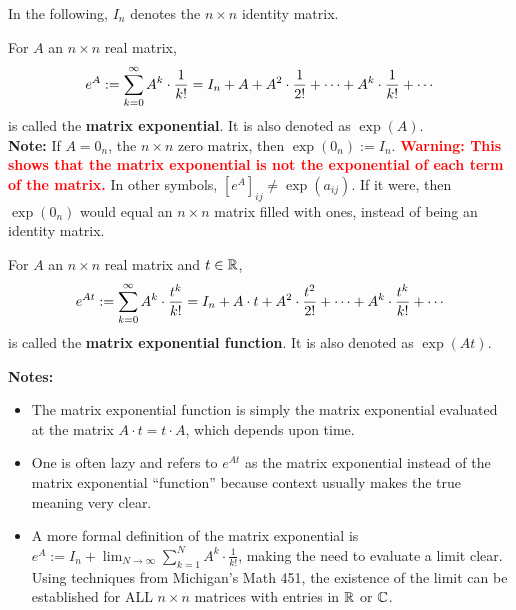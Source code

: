 \begin{tcolorbox}[colback=mylightblue, title = {\bf Matrix Exponential and Exponential Function}, breakable]
In the following, $I_n$ denotes the $n \times n$ identity matrix.
\begin{definition}
For $A$ an $n \times n$ real matrix,
\begin{equation}
    \label{eq:matrixExponential}
  e^{A}:=  \sum_{k=0}^\infty A^k \cdot \frac{1}{k!} = I_n + A  + A^2 \cdot \frac{1}{2!} + \cdots + A^k \cdot \frac{1}{k!} + \cdots \\[1em]
\end{equation}
is called the \textbf{matrix exponential}. It is also denoted as $\exp(A)$. \\

\textbf{Note:} If $A=0_{n}$, the $n \times n$ zero matrix, then $\exp(0_n):=I_n$. \textcolor{red}{\bf Warning: This shows that the matrix exponential is not the exponential of each term of the matrix.}  In other symbols, $\left[e^{A}\right]_{ij} \neq \exp(a_{ij})$. If it were, then $\exp(0_n)$ would equal an $n \times n$ matrix filled with ones, instead of being an identity matrix.\\

\end{definition}

\begin{definition}
For $A$ an $n \times n$ real matrix and $t\in \mathbb R$,
\begin{equation}
    \label{eq:matrixExponentialFunction}
  e^{A t}:=  \sum_{k=0}^\infty A^k \cdot \frac{t^k}{k!} = I_n + A \cdot t + A^2 \cdot \frac{t^2}{2!} + \cdots + A^k \cdot \frac{t^k}{k!} + \cdots \\[1em]
\end{equation}
is called the \textbf{matrix exponential function}. It is also denoted as $\exp(At)$. \\

\end{definition}
\bigskip
\textbf{Notes:} \,
\begin{itemize}
    \item The matrix exponential function is simply the matrix exponential evaluated at the matrix $A\cdot t = t \cdot A$, which depends upon time. 
    \item One is often lazy and refers to $e^{A t}$ as the matrix exponential instead of the matrix exponential ``function'' because context usually makes the true meaning very clear.
    \item A more formal definition of the matrix exponential is $e^{A}:= I_n +  \displaystyle \lim_{N \to \infty}\sum_{k=1}^N A^k \cdot \frac{1}{k!}$, making the need to evaluate a limit clear. Using techniques from Michigan's Math 451, the existence of the limit can be established for ALL $n \times n$ matrices with entries in $\mathbb R$ or $\mathbb C$.
\end{itemize}

\end{tcolorbox}

